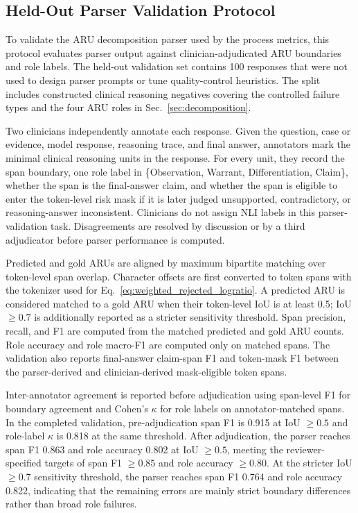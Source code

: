 \documentclass[a4paper,fleqn,doubleblind]{cas-sc}
\begin{document}
\subsection{Held-Out Parser Validation Protocol}
\label{app:aru_parser_validation}

To validate the ARU decomposition parser used by the process metrics, this protocol evaluates parser output against clinician-adjudicated ARU boundaries and role labels. The held-out validation set contains 100 responses that were not used to design parser prompts or tune quality-control heuristics. The split includes constructed clinical reasoning negatives covering the controlled failure types and the four ARU roles in Sec.~\ref{sec:decomposition}.

Two clinicians independently annotate each response. Given the question, case or evidence, model response, reasoning trace, and final answer, annotators mark the minimal clinical reasoning units in the response. For every unit, they record the span boundary, one role label in \{Observation, Warrant, Differentiation, Claim\}, whether the span is the final-answer claim, and whether the span is eligible to enter the token-level risk mask if it is later judged unsupported, contradictory, or reasoning-answer inconsistent. Clinicians do not assign NLI labels in this parser-validation task. Disagreements are resolved by discussion or by a third adjudicator before parser performance is computed.

Predicted and gold ARUs are aligned by maximum bipartite matching over token-level span overlap. Character offsets are first converted to token spans with the tokenizer used for Eq.~\ref{eq:weighted_rejected_logratio}. A predicted ARU is considered matched to a gold ARU when their token-level IoU is at least 0.5; IoU $\geq 0.7$ is additionally reported as a stricter sensitivity threshold. Span precision, recall, and F1 are computed from the matched predicted and gold ARU counts. Role accuracy and role macro-F1 are computed only on matched spans. The validation also reports final-answer claim-span F1 and token-mask F1 between the parser-derived and clinician-derived mask-eligible token spans.

Inter-annotator agreement is reported before adjudication using span-level F1 for boundary agreement and Cohen's $\kappa$ for role labels on annotator-matched spans. In the completed validation, pre-adjudication span F1 is 0.915 at IoU $\geq 0.5$ and role-label $\kappa$ is 0.818 at the same threshold. After adjudication, the parser reaches span F1 0.863 and role accuracy 0.802 at IoU $\geq 0.5$, meeting the reviewer-specified targets of span F1 $\geq 0.85$ and role accuracy $\geq 0.80$. At the stricter IoU $\geq 0.7$ sensitivity threshold, the parser reaches span F1 0.764 and role accuracy 0.822, indicating that the remaining errors are mainly strict boundary differences rather than broad role failures.
\end{document}
